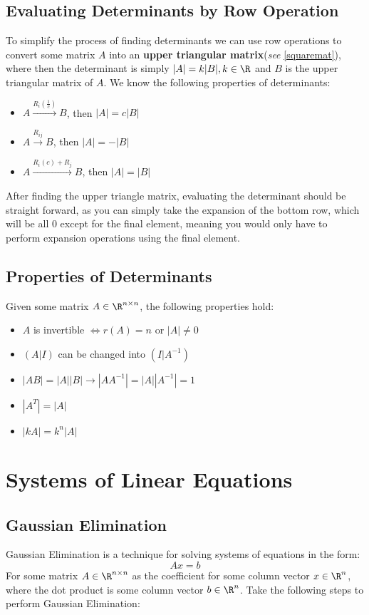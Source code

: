 \documentclass[a4paper]{article}
\begin{document}
  \subsection{Evaluating Determinants by Row Operation}
  To simplify the process of finding determinants we can use row operations to convert some matrix $A$ into an \textbf{upper triangular matrix}(\textit{see} \ref{squaremat}), where then the determinant is simply $|A| = k|B|, k\in \R$ and $B$ is the upper triangular matrix of $A$.
  We know the following properties of determinants:
  \begin{itemize}
    \item $A \overset{\displaystyle{R_i (\frac{1 }{c})}}{\longrightarrow} B$, then $|A| = c|B|$
    \item $A \overset{\displaystyle{R_{ij}}}{\longrightarrow} B$, then $|A| = -|B|$
    \item $A \overset{\displaystyle{R_i(c)+R_j }}{\longrightarrow} B$, then $|A| = |B|$
  \end{itemize}
  After finding the upper triangle matrix, evaluating the determinant should be straight forward, as you can simply take the expansion of the bottom row, which will be all 0 except for the final element, meaning you would only have to perform expansion operations using the final element.
  \subsection{Properties of Determinants}
  Given some matrix $A \in \R^{n\times n}$, the following properties hold:
  \begin{itemize}
    \item $A$ is invertible $\Leftrightarrow r(A) = n$ or $|A| \neq 0$
    \item $(A|I)$ can be changed into $(I|A^{-1})$
    \item $|AB| = |A||B| \rightarrow |AA^{-1}| = |A||A^{-1}| = 1$
    \item $|A^T| = |A|$
    \item $|kA| = k^n|A|$
  \end{itemize}
  \newpage
  \section{Systems of Linear Equations} 
  \subsection{Gaussian Elimination}\label{gausselim}
  Gaussian Elimination is a technique for solving systems of equations in the form:
  \[
    Ax = b 
  \]
  For some matrix $A \in \R^{n\times n}$ as the coefficient for some column vector $x \in \R^n$, where the dot product is some column vector $b \in \R^n$. Take the following steps to perform Gaussian Elimination:
\end{document}
